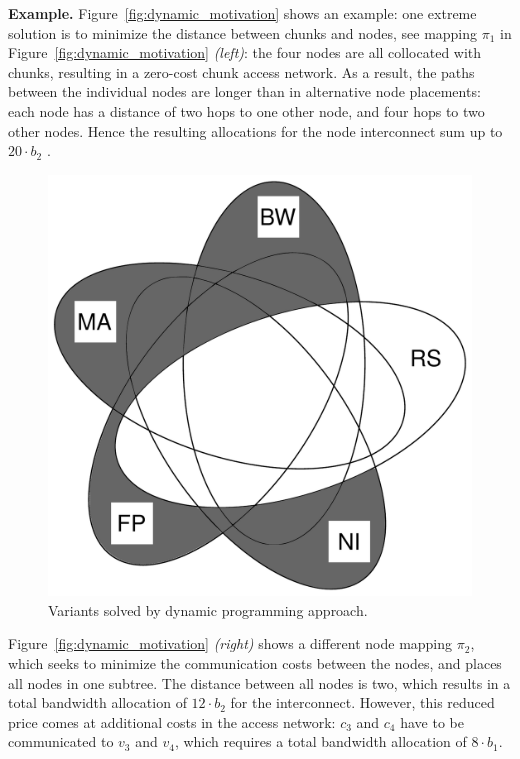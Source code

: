 \documentclass[preprint,12pt]{elsarticle}
\newcommand{\NodeMapping}{\pi}
\newcommand{\CostTrans}{\ensuremath{b_1}}
\newcommand{\CostCom}{\ensuremath{b_2}}
\begin{document}
\textbf{Example.} Figure~\ref{fig:dynamic_motivation} shows an example: one
extreme solution is to minimize the distance between chunks and nodes,
see mapping $\NodeMapping_1$ in
Figure~\ref{fig:dynamic_motivation} \emph{(left)}: the four nodes are all
collocated with chunks, resulting in a zero-cost chunk access network. As a
result, the paths between the individual nodes are longer than in alternative
node placements: each node has a distance of two hops to one other node,
and four hops to two other nodes. Hence the resulting allocations for the
node interconnect sum up to $20 \cdot \CostCom$ .
\begin{figure}
\vspace{-1em}
\includegraphics[width=0.48\columnwidth]{figs/venn_dp.pdf}
\caption{Variants solved by dynamic programming approach.}
\vspace{-1em}
\label{fig:venn_flow}
\end{figure}
Figure~\ref{fig:dynamic_motivation} \emph{(right)} shows a different node
mapping $\NodeMapping_2$, which seeks to minimize the communication costs
between the nodes, and places all nodes in one subtree. The distance between all
nodes is two, which results in a total bandwidth allocation of $12\cdot\CostCom$
for the interconnect. However, this reduced price comes at additional costs in
the access network: $c_3$ and $c_4$ have to be communicated to $v_3$ and $v_4$,
which requires a total bandwidth allocation of $8 \cdot \CostTrans$.
\end{document}
